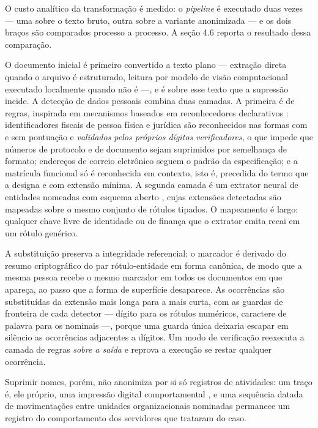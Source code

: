 O custo analítico da transformação é medido: o \emph{pipeline} é executado duas vezes --- uma sobre
o texto bruto, outra sobre a variante anonimizada --- e os dois braços são comparados processo a
processo. A seção 4.6 reporta o resultado dessa comparação.

O documento inicial é primeiro convertido a texto plano --- extração direta quando o arquivo é
estruturado, leitura por modelo de visão computacional executado localmente quando não é ---, e é
sobre esse texto que a supressão incide. A detecção de dados pessoais combina duas camadas. A
primeira é de regras, inspirada em mecanismos baseados em reconhecedores declarativos
\cite{microsoftpresidio}: identificadores fiscais de pessoa física e jurídica são reconhecidos nas
formas com e sem pontuação e \emph{validados pelos próprios dígitos verificadores}, o que impede
que números de protocolo e de documento sejam suprimidos por semelhança de formato; endereços de
correio eletrônico seguem o padrão da especificação; e a matrícula funcional só é reconhecida em
contexto, isto é, precedida do termo que a designa e com extensão mínima. A segunda camada é um
extrator neural de entidades nomeadas com esquema aberto \cite{zaratiana2025gliner2}, cujas
extensões detectadas são mapeadas sobre o mesmo conjunto de rótulos tipados. O mapeamento é largo:
qualquer chave livre de identidade ou de finança que o extrator emita recai em um rótulo genérico.

A substituição preserva a integridade referencial: o marcador é derivado do resumo criptográfico do
par rótulo-entidade em forma canônica, de modo que a mesma pessoa recebe o mesmo marcador em todos
os documentos em que apareça, ao passo que a forma de superfície desaparece. As ocorrências são
substituídas da extensão mais longa para a mais curta, com as guardas de fronteira de cada detector
--- dígito para os rótulos numéricos, caractere de palavra para os nominais ---, porque uma guarda
única deixaria escapar em silêncio as ocorrências adjacentes a dígitos. Um modo de verificação
reexecuta a camada de regras \emph{sobre a saída} e reprova a execução se restar qualquer
ocorrência.

Suprimir nomes, porém, não anonimiza por si só registros de atividades: um traço é, ele próprio, uma
impressão digital comportamental \cite{mannhardt2019privacy, elkoumy2022privacy}, e uma sequência
datada de movimentações entre unidades organizacionais nominadas permanece um registro do
comportamento dos servidores que trataram do caso.

